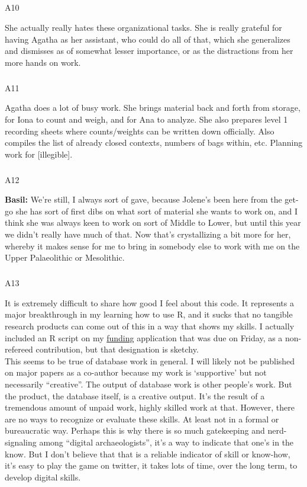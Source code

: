 \documentclass[
  canadian,
]{article}
\makeatletter
\let\oldsubparagraph\subparagraph
\renewcommand{\subparagraph}{
    \@ifstar
      \xxxSubParagraphStar
      \xxxSubParagraphNoStar
  }
\newcommand{\xxxSubParagraphStar}[1]{\oldsubparagraph*{#1}\mbox{}}
\newcommand{\xxxSubParagraphNoStar}[1]{\oldsubparagraph{#1}\mbox{}}
\makeatother
\begin{document}
\subparagraph{A10}\label{sec-A10}

She actually really hates these organizational tasks. She is really
grateful for having Agatha as her assistant, who could do all of that,
which she generalizes and dismisses as of somewhat lesser importance, or
as the distractions from her more hands on work.

\subparagraph{A11}\label{sec-A11}

Agatha does a lot of busy work. She brings material back and forth from
storage, for Iona to count and weigh, and for Ana to analyze. She also
prepares level 1 recording sheets where counts/weights can be written
down officially. Also compiles the list of already closed contexts,
numbers of bags within, etc. Planning work for {[}illegible{]}.

\subparagraph{A12}\label{sec-A12}

\textbf{Basil:} We're still, I always sort of gave, because Jolene's
been here from the get-go she has sort of first dibs on what sort of
material she wants to work on, and I think she was always keen to work
on sort of Middle to Lower, but until this year we didn't really have
much of that. Now that's crystallizing a bit more for her, whereby it
makes sense for me to bring in somebody else to work with me on the
Upper Palaeolithic or Mesolithic.

\subparagraph{A13}\label{sec-A13}

It is extremely difficult to share how good I feel about this code. It
represents a major breakthrough in my learning how to use R, and it
sucks that no tangible research products can come out of this in a way
that shows my skills. I actually included an R script on my
\hyperref[funding]{funding} application that was due on Friday, as a
non-refereed contribution, but that designation is sketchy.\\
This seems to be true of database work in general. I will likely not be
published on major papers as a co-author because my work is `supportive'
but not necessarily ``creative''. The output of database work is other
people's work. But the product, the database itself, is a creative
output. It's the result of a tremendous amount of unpaid work, highly
skilled work at that. However, there are no ways to recognize or
evaluate these skills. At least not in a formal or bureaucratic way.
Perhaps this is why there is so much gatekeeping and nerd-signaling
among ``digital archaeologists'', it's a way to indicate that one's in
the know. But I don't believe that that is a reliable indicator of skill
or know-how, it's easy to play the game on twitter, it takes lots of
time, over the long term, to develop digital skills.
\end{document}
